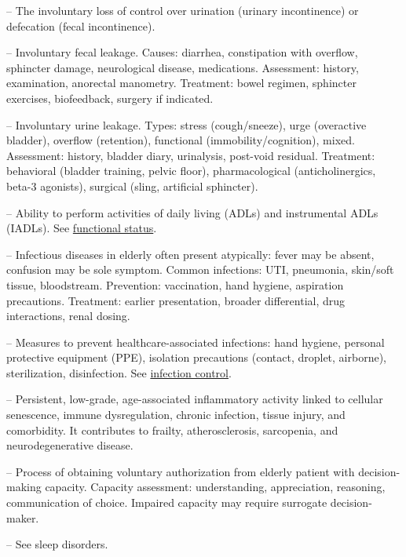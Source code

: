 -- The involuntary loss of control over urination (urinary incontinence) or defecation (fecal incontinence).



-- Involuntary fecal leakage. Causes: diarrhea, constipation with overflow, sphincter damage, neurological disease, medications. Assessment: history, examination, anorectal manometry. Treatment: bowel regimen, sphincter exercises, biofeedback, surgery if indicated.

-- Involuntary urine leakage. Types: stress (cough/sneeze), urge (overactive bladder), overflow (retention), functional (immobility/cognition), mixed. Assessment: history, bladder diary, urinalysis, post-void residual. Treatment: behavioral (bladder training, pelvic floor), pharmacological (anticholinergics, beta-3 agonists), surgical (sling, artificial sphincter).

-- Ability to perform activities of daily living (ADLs) and instrumental ADLs (IADLs). See \hyperlink{Functional Status}{functional status}.


-- Infectious diseases in elderly often present atypically: fever may be absent, confusion may be sole symptom. Common infections: UTI, pneumonia, skin/soft tissue, bloodstream. Prevention: vaccination, hand hygiene, aspiration precautions. Treatment: earlier presentation, broader differential, drug interactions, renal dosing.




-- Measures to prevent healthcare-associated infections: hand hygiene, personal protective equipment (PPE), isolation precautions (contact, droplet, airborne), sterilization, disinfection. See \hyperlink{Infection Control}{infection control}.

-- Persistent, low-grade, age-associated inflammatory activity linked to cellular senescence, immune dysregulation, chronic infection, tissue injury, and comorbidity. It contributes to frailty, atherosclerosis, sarcopenia, and neurodegenerative disease.

-- Process of obtaining voluntary authorization from elderly patient with decision-making capacity. Capacity assessment: understanding, appreciation, reasoning, communication of choice. Impaired capacity may require surrogate decision-maker.


-- See sleep disorders.

